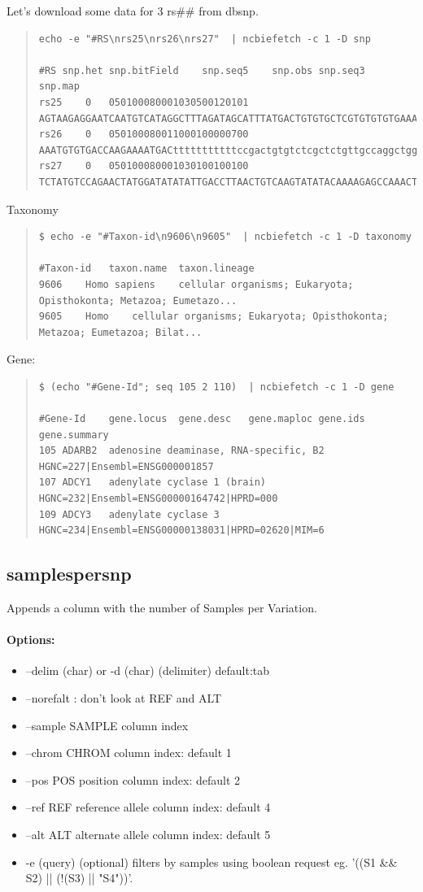 \documentclass[12pt]{article}
\begin{document}
Let's download some data for 3 rs\#\# from dbsnp.
\begin{quote}
\begin{verbatim}
echo -e "#RS\nrs25\nrs26\nrs27"  | ncbiefetch -c 1 -D snp

#RS	snp.het	snp.bitField	snp.seq5	snp.obs	snp.seq3	snp.map
rs25	0	050100080001030500120101	AGTAAGAGGAATCAATGTCATAGGCTTTAGATAGCATTTATGACTGTGTGCTCGTGTGTGTGAAAACT..
rs26	0	050100080011000100000700	AAATGTGTGACCAAGAAAATGACtttttttttttccgactgtgtctcgctctgttgccaggctggagt..
rs27	0	050100080001030100100100	TCTATGTCCAGAACTATGGATATATATTGACCTTAACTGTCAAGTATATACAAAAGAGCCAAACTGCA..
\end{verbatim}
\end{quote}

Taxonomy
\begin{quote}
\begin{verbatim}
$ echo -e "#Taxon-id\n9606\n9605"  | ncbiefetch -c 1 -D taxonomy

#Taxon-id	taxon.name	taxon.lineage
9606	Homo sapiens	cellular organisms; Eukaryota; Opisthokonta; Metazoa; Eumetazo...
9605	Homo	cellular organisms; Eukaryota; Opisthokonta; Metazoa; Eumetazoa; Bilat...
\end{verbatim}
\end{quote}

Gene:
\begin{quote}
\begin{verbatim}
$ (echo "#Gene-Id"; seq 105 2 110)  | ncbiefetch -c 1 -D gene

#Gene-Id	gene.locus	gene.desc	gene.maploc	gene.ids	gene.summary
105	ADARB2	adenosine deaminase, RNA-specific, B2		HGNC=227|Ensembl=ENSG000001857
107	ADCY1	adenylate cyclase 1 (brain)		HGNC=232|Ensembl=ENSG00000164742|HPRD=000
109	ADCY3	adenylate cyclase 3		HGNC=234|Ensembl=ENSG00000138031|HPRD=02620|MIM=6
\end{verbatim}
\end{quote}

\subsection{samplespersnp}
Appends a column with the number of Samples per Variation.
\paragraph{Options:}
\begin{itemize}
\item--delim (char) or -d  (char) (delimiter) default:tab
\item--norefalt : don't look at REF and ALT
\item--sample SAMPLE column index
\item--chrom CHROM column index: default 1
\item--pos POS position column index: default 2
\item--ref REF reference allele column index: default 4
\item--alt ALT alternate allele column index: default 5
\item-e (query) (optional) filters by samples using boolean request eg. '((S1 \&\& S2) || (!(S3) || "S4"))'.
\end{itemize}
\end{document}
